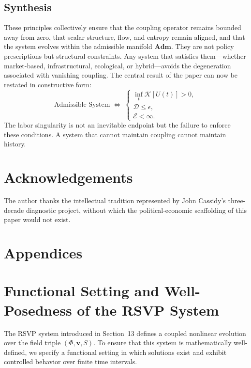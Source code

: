 \documentclass[11pt, a4paper]{article}
\theoremstyle{plain}
\theoremstyle{definition}
\newcommand{\Phifield}{\Phi}
\newcommand{\vfield}{\mathbf{v}}
\newcommand{\Sfield}{S}
\newcommand{\Adm}{\mathbf{Adm}}
\begin{document}
\subsection*{Synthesis}

These principles collectively ensure that the coupling operator remains
bounded away from zero, that scalar structure, flow, and entropy remain
aligned, and that the system evolves within the admissible manifold $\Adm$.
They are not policy prescriptions but structural constraints. Any system that
satisfies them---whether market-based, infrastructural, ecological, or
hybrid---avoids the degeneration associated with vanishing coupling. The
central result of the paper can now be restated in constructive form:
\[
  \text{Admissible System}
  \;\Longleftrightarrow\;
  \begin{cases}
    \inf_t \mathcal{K}[U(t)] > 0, \\[2pt]
    \mathcal{D} \leq \epsilon, \\[2pt]
    \mathcal{E} < \infty.
  \end{cases}
\]
The labor singularity is not an inevitable endpoint but the failure to enforce
these conditions. A system that cannot maintain coupling cannot maintain history.

\section*{Acknowledgements}

The author thanks the intellectual tradition represented by John Cassidy's
three-decade diagnostic project, without which the political-economic
scaffolding of this paper would not exist.

\newpage
\section*{Appendices}
\appendix

\section{Functional Setting and Well-Posedness of the RSVP System}

The RSVP system introduced in Section~13 defines a coupled nonlinear evolution
over the field triple $(\Phifield, \vfield, \Sfield)$. To ensure that this
system is mathematically well-defined, we specify a functional setting in
which solutions exist and exhibit controlled behavior over finite time intervals.
\end{document}
